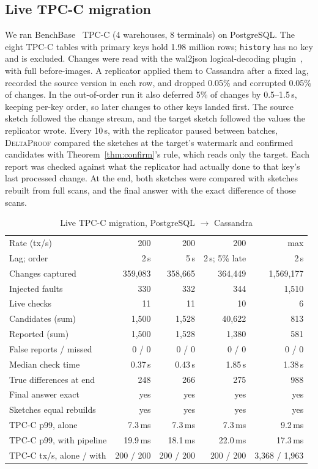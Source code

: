 \documentclass[conference]{IEEEtran}
\newcommand{\sys}{\textsc{DeltaProof}}
\begin{document}
\subsection{Live TPC-C migration}
We ran BenchBase~\cite{difallah2013} TPC-C (4 warehouses, 8 terminals) on PostgreSQL. The eight TPC-C tables with primary keys hold 1.98 million rows; \texttt{history} has no key and is excluded. Changes were read with the wal2json logical-decoding plugin~\cite{wal2json}, with full before-images. A replicator applied them to Cassandra after a fixed lag, recorded the source version in each row, and dropped 0.05\% and corrupted 0.05\% of changes. In the out-of-order run it also deferred 5\% of changes by 0.5--1.5\,s, keeping per-key order, so later changes to other keys landed first. The source sketch followed the change stream, and the target sketch followed the values the replicator wrote. Every 10\,s, with the replicator paused between batches, \sys{} compared the sketches at the target's watermark and confirmed candidates with Theorem~\ref{thm:confirm}'s rule, which reads only the target. Each report was checked against what the replicator had actually done to that key's last processed change. At the end, both sketches were compared with sketches rebuilt from full scans, and the final answer with the exact difference of those scans.

\begin{table}[t]
\caption{Live TPC-C migration, PostgreSQL $\to$ Cassandra}
\label{tab:tpcc}
\centering\footnotesize
\setlength{\tabcolsep}{2.2pt}
\begin{tabular}{@{}lrrrr@{}}
\toprule
Rate (tx/s) & 200 & 200 & 200 & max\\
Lag; order & 2\,s & 5\,s & 2\,s; 5\% late & 2\,s\\
\midrule
Changes captured & 359{,}083 & 358{,}665 & 364{,}449 & 1{,}569{,}177\\
Injected faults & 330 & 332 & 344 & 1{,}510\\
Live checks & 11 & 11 & 10 & 6\\
Candidates (sum) & 1{,}500 & 1{,}528 & 40{,}622 & 813\\
Reported (sum) & 1{,}500 & 1{,}528 & 1{,}380 & 581\\
False reports / missed & 0 / 0 & 0 / 0 & 0 / 0 & 0 / 0\\
Median check time & 0.37\,s & 0.43\,s & 1.85\,s & 1.38\,s\\
True differences at end & 248 & 266 & 275 & 988\\
Final answer exact & yes & yes & yes & yes\\
Sketches equal rebuilds & yes & yes & yes & yes\\
\midrule
TPC-C p99, alone & 7.3\,ms & 7.3\,ms & 7.3\,ms & 9.2\,ms\\
TPC-C p99, with pipeline & 19.9\,ms & 18.1\,ms & 22.0\,ms & 17.3\,ms\\
TPC-C tx/s, alone / with & 200 / 200 & 200 / 200 & 200 / 200 & 3{,}368 / 1{,}963\\
\bottomrule
\end{tabular}
\end{table}
\end{document}
